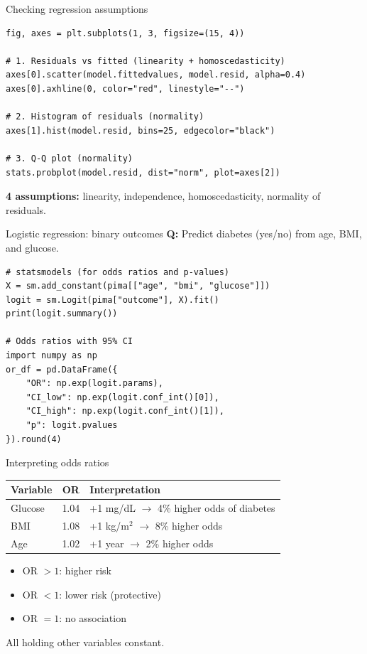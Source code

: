 \documentclass[aspectratio=169,11pt]{beamer}
\begin{document}
\begin{frame}[fragile]{Checking regression assumptions}
\begin{verbatim}
fig, axes = plt.subplots(1, 3, figsize=(15, 4))

# 1. Residuals vs fitted (linearity + homoscedasticity)
axes[0].scatter(model.fittedvalues, model.resid, alpha=0.4)
axes[0].axhline(0, color="red", linestyle="--")

# 2. Histogram of residuals (normality)
axes[1].hist(model.resid, bins=25, edgecolor="black")

# 3. Q-Q plot (normality)
stats.probplot(model.resid, dist="norm", plot=axes[2])
\end{verbatim}

\textbf{4 assumptions:} linearity, independence, homoscedasticity, normality of residuals.
\end{frame}

\begin{frame}[fragile]{Logistic regression: binary outcomes}
\textbf{Q:} Predict diabetes (yes/no) from age, BMI, and glucose.

\begin{verbatim}
# statsmodels (for odds ratios and p-values)
X = sm.add_constant(pima[["age", "bmi", "glucose"]])
logit = sm.Logit(pima["outcome"], X).fit()
print(logit.summary())

# Odds ratios with 95% CI
import numpy as np
or_df = pd.DataFrame({
    "OR": np.exp(logit.params),
    "CI_low": np.exp(logit.conf_int()[0]),
    "CI_high": np.exp(logit.conf_int()[1]),
    "p": logit.pvalues
}).round(4)
\end{verbatim}
\end{frame}

\begin{frame}{Interpreting odds ratios}
\begin{table}
\begin{tabular}{lcl}
\toprule
\textbf{Variable} & \textbf{OR} & \textbf{Interpretation} \\
\midrule
Glucose & 1.04 & +1 mg/dL $\to$ 4\% higher odds of diabetes \\
BMI & 1.08 & +1 kg/m$^2$ $\to$ 8\% higher odds \\
Age & 1.02 & +1 year $\to$ 2\% higher odds \\
\bottomrule
\end{tabular}
\end{table}

\vspace{6pt}
\begin{itemize}
  \item OR $> 1$: higher risk
  \item OR $< 1$: lower risk (protective)
  \item OR $= 1$: no association
\end{itemize}

All \alert{holding other variables constant}.
\end{frame}
\end{document}
